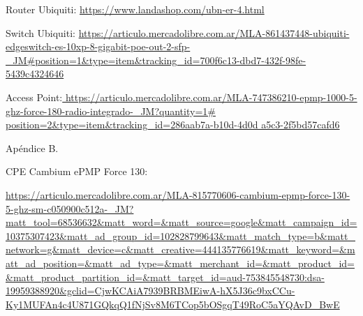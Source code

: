 \begin{thebibliography}{99}

 Router Ubiquiti: {\tiny \url{https://www.landashop.com/ubn-er-4.html}}


 Switch Ubiquiti: {\tiny \url{https://articulo.mercadolibre.com.ar/MLA-861437448-ubiquiti-edgeswitch-es-10xp-8-gigabit-poe-out-2-sfp-_JM#position=1&type=item&tracking_id=700f6c13-dbd7-432f-98fe-5439c4324646}}



Access Point:{\tiny \url{ https://articulo.mercadolibre.com.ar/MLA-747386210-epmp-1000-5-ghz-force-180-radio-integrado-_JM?quantity=1# position=2&type=item&tracking_id=286aab7a-b10d-4d0d a5c3-2f5bd57cafd6}}


 Apéndice B.

CPE Cambium ePMP Force 130: \begin{tiny}
\url{https://articulo.mercadolibre.com.ar/MLA-815770606-cambium-epmp-force-130-5-ghz-sm-c050900c512a-_JM?matt_tool=68536632&matt_word=&matt_source=google&matt_campaign_id=10375307423&matt_ad_group_id=102828799643&matt_match_type=b&matt_network=g&matt_device=c&matt_creative=444135776619&matt_keyword=&matt_ad_position=&matt_ad_type=&matt_merchant_id=&matt_product_id=&matt_product_partition_id=&matt_target_id=aud-753845548730:dsa-19959388920&gclid=CjwKCAiA7939BRBMEiwA-hX5J36c9bxCCu-Ky1MUFAn4c4U871GQkqQ1fNjSv8M6TCop5bOSgqT49RoC5aYQAvD_BwE}
\end{tiny}
\end{thebibliography}

\newpage